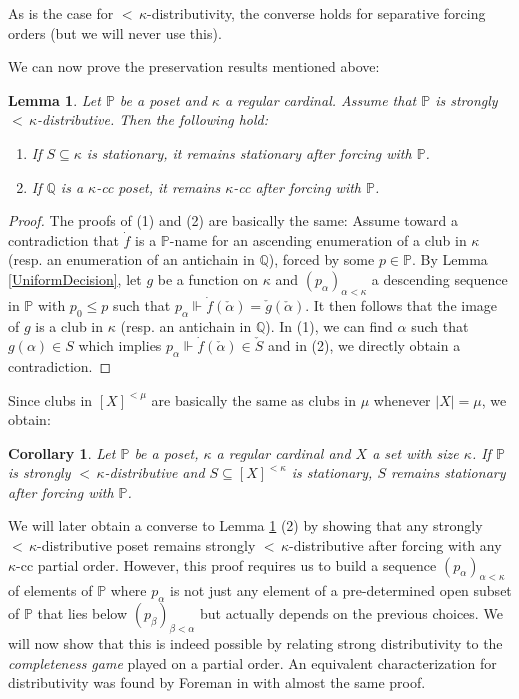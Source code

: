 \documentclass[12pt]{amsart}
\theoremstyle{definition}
\theoremstyle{remark}
\theoremstyle{plain}
\newtheorem{mycol}[mydef]{Corollary}
\newtheorem{mylem}[mydef]{Lemma}
\numberwithin{mydef}{section}
\newcommand{\dP}{\mathbb{P}}
\newcommand{\dQ}{\mathbb{Q}}
\begin{document}
	As is the case for ${<}\,\kappa$-distributivity, the converse holds for separative forcing orders (but we will never use this).
	
	We can now prove the preservation results mentioned above:
	
	\begin{mylem}\label{PreservationProp}
		Let $\dP$ be a poset and $\kappa$ a regular cardinal. Assume that $\dP$ is strongly ${<}\,\kappa$-distributive. Then the following hold:
		\begin{enumerate}
			\item If $S\subseteq\kappa$ is stationary, it remains stationary after forcing with $\dP$.
			\item If $\dQ$ is a $\kappa$-cc poset, it remains $\kappa$-cc after forcing with $\dP$.
		\end{enumerate}
	\end{mylem}
	
	\begin{proof}
		The proofs of (1) and (2) are basically the same: Assume toward a contradiction that $\dot{f}$ is a $\dP$-name for an ascending enumeration of a club in $\kappa$ (resp. an enumeration of an antichain in $\dQ$), forced by some $p\in\dP$. By Lemma \ref{UniformDecision}, let $g$ be a function on $\kappa$ and $(p_{\alpha})_{\alpha<\kappa}$ a descending sequence in $\dP$ with $p_0\leq p$ such that $p_{\alpha}\Vdash\dot{f}(\check{\alpha})=\check{g}(\check{\alpha})$. It then follows that the image of $g$ is a club in $\kappa$ (resp. an antichain in $\dQ$). In (1), we can find $\alpha$ such that $g(\alpha)\in S$ which implies $p_{\alpha}\Vdash\dot{f}(\check{\alpha})\in\check{S}$ and in (2), we directly obtain a contradiction.
	\end{proof}
	
	Since clubs in $[X]^{<\mu}$ are basically the same as clubs in $\mu$ whenever $|X|=\mu$, we obtain:
	
	\begin{mycol}\label{PresPropGen}
		Let $\dP$ be a poset, $\kappa$ a regular cardinal and $X$ a set with size $\kappa$. If $\dP$ is strongly ${<}\,\kappa$-distributive and $S\subseteq[X]^{<\kappa}$ is stationary, $S$ remains stationary after forcing with $\dP$.
	\end{mycol}
	
	We will later obtain a converse to Lemma \ref{PreservationProp} (2) by showing that any strongly ${<}\,\kappa$-distributive poset remains strongly ${<}\,\kappa$-distributive after forcing with any $\kappa$-cc partial order. However, this proof requires us to build a sequence $(p_{\alpha})_{\alpha<\kappa}$ of elements of $\dP$ where $p_{\alpha}$ is not just any element of a pre-determined open subset of $\dP$ that lies below $(p_{\beta})_{\beta<\alpha}$ but actually depends on the previous choices. We will now show that this is indeed possible by relating strong distributivity to the \emph{completeness game} played on a partial order. An equivalent characterization for distributivity was found by Foreman in \cite{ForemanBool} with almost the same proof.
	
\end{document}
